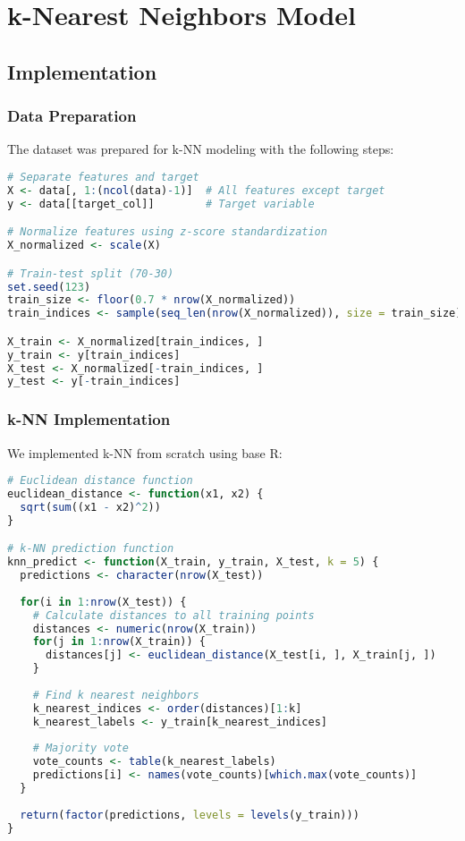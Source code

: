 \section{k-Nearest Neighbors Model}
\label{sec:knn-model}

\subsection{Implementation}
\subsubsection{Data Preparation}
The dataset was prepared for k-NN modeling with the following steps:

\begin{lstlisting}[language=R]
# Separate features and target
X <- data[, 1:(ncol(data)-1)]  # All features except target
y <- data[[target_col]]        # Target variable

# Normalize features using z-score standardization
X_normalized <- scale(X)

# Train-test split (70-30)
set.seed(123)
train_size <- floor(0.7 * nrow(X_normalized))
train_indices <- sample(seq_len(nrow(X_normalized)), size = train_size)

X_train <- X_normalized[train_indices, ]
y_train <- y[train_indices]
X_test <- X_normalized[-train_indices, ]
y_test <- y[-train_indices]
\end{lstlisting}

\subsubsection{k-NN Implementation}
We implemented k-NN from scratch using base R:

\begin{lstlisting}[language=R]
# Euclidean distance function
euclidean_distance <- function(x1, x2) {
  sqrt(sum((x1 - x2)^2))
}

# k-NN prediction function
knn_predict <- function(X_train, y_train, X_test, k = 5) {
  predictions <- character(nrow(X_test))
  
  for(i in 1:nrow(X_test)) {
    # Calculate distances to all training points
    distances <- numeric(nrow(X_train))
    for(j in 1:nrow(X_train)) {
      distances[j] <- euclidean_distance(X_test[i, ], X_train[j, ])
    }
    
    # Find k nearest neighbors
    k_nearest_indices <- order(distances)[1:k]
    k_nearest_labels <- y_train[k_nearest_indices]
    
    # Majority vote
    vote_counts <- table(k_nearest_labels)
    predictions[i] <- names(vote_counts)[which.max(vote_counts)]
  }
  
  return(factor(predictions, levels = levels(y_train)))
}
\end{lstlisting}

